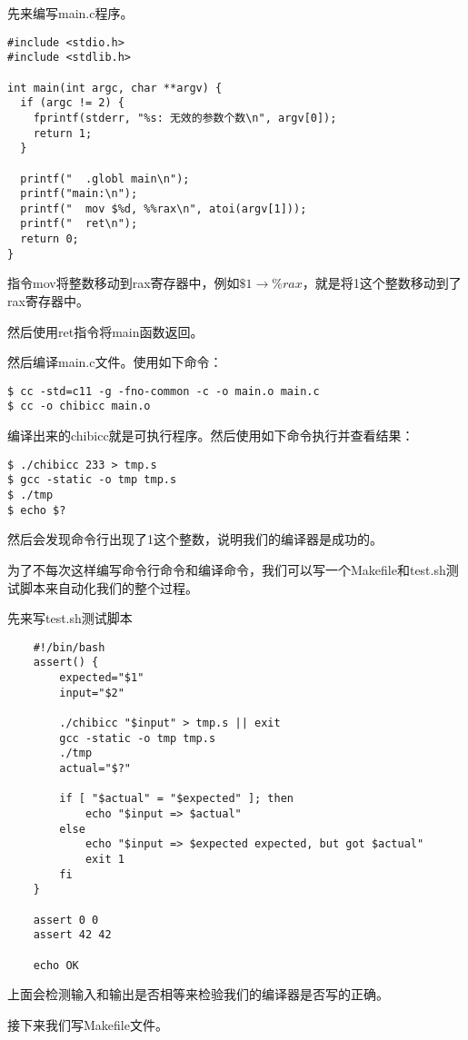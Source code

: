 \documentclass[cn,10pt,math=newtx,citestyle=gb7714-2015,bibstyle=gb7714-2015]{elegantbook}
\begin{document}
先来编写main.c程序。

\begin{verbatim}
#include <stdio.h>
#include <stdlib.h>

int main(int argc, char **argv) {
  if (argc != 2) {
    fprintf(stderr, "%s: 无效的参数个数\n", argv[0]);
    return 1;
  }

  printf("  .globl main\n");
  printf("main:\n");
  printf("  mov $%d, %%rax\n", atoi(argv[1]));
  printf("  ret\n");
  return 0;
}
\end{verbatim}

指令mov将整数移动到rax寄存器中，例如$\$1 \rightarrow \%rax$，就是将1这个整数移动到了rax寄存器中。

然后使用ret指令将main函数返回。

然后编译main.c文件。使用如下命令：

\begin{verbatim}
$ cc -std=c11 -g -fno-common -c -o main.o main.c
$ cc -o chibicc main.o
\end{verbatim}

编译出来的chibicc就是可执行程序。然后使用如下命令执行并查看结果：

\begin{verbatim}
$ ./chibicc 233 > tmp.s
$ gcc -static -o tmp tmp.s
$ ./tmp
$ echo $?
\end{verbatim}

然后会发现命令行出现了1这个整数，说明我们的编译器是成功的。

为了不每次这样编写命令行命令和编译命令，我们可以写一个Makefile和test.sh测试脚本来自动化我们的整个过程。

先来写test.sh测试脚本

\begin{verbatim}
    #!/bin/bash
    assert() {
        expected="$1"
        input="$2"

        ./chibicc "$input" > tmp.s || exit
        gcc -static -o tmp tmp.s
        ./tmp
        actual="$?"

        if [ "$actual" = "$expected" ]; then
            echo "$input => $actual"
        else
            echo "$input => $expected expected, but got $actual"
            exit 1
        fi
    }

    assert 0 0
    assert 42 42

    echo OK
\end{verbatim}

上面会检测输入和输出是否相等来检验我们的编译器是否写的正确。

接下来我们写Makefile文件。
\end{document}
